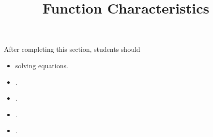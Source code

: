 \documentclass{ximera}
\title{Function Characteristics}
\begin{document}
\begin{abstract}
\end{abstract}
\maketitle

\begin{sectionOutcomes}
After completing this section, students should 

\begin{itemize}
\item solving equations.
\item .
\item .
\item .
\item .
\end{itemize}
\end{sectionOutcomes}
\end{document}

